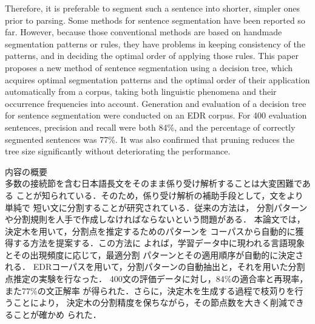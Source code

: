 Therefore, it is preferable to segment such a sentence into
 shorter, simpler ones prior to parsing.
 Some methods for sentence segmentation have been reported
 so far. However,  
because those conventional methods are based on handmade segmentation
 patterns or rules, they have problems in keeping consistency of
 the patterns, and
in deciding the optimal order of applying those rules.
This paper proposes a new method of sentence segmentation
 using a decision tree,  which acquires optimal segmentation
 patterns and the optimal order of their application
automatically from a corpus,
taking both linguistic phenomena and their occurrence
 frequencies into account. 
Generation and evaluation of a decision tree for sentence
segmentation were conducted on
an EDR corpus. For 400 evaluation sentences, precision and recall
were both 84\%, and the percentage of correctly segmented sentences
was 77\%.
It was also confirmed that pruning  reduces the
tree size significantly without deteriorating the performance.

\newpage
\noindent
内容の概要\\
多数の接続節を含む日本語長文をそのまま係り受け解析することは大変困難である
ことが知られている．そのため，係り受け解析の補助手段として，文をより単純で
短い文に分割することが研究されている．従来の方法は，
分割パターンや分割規則を人手で作成しなければならないという問題がある．
本論文では，決定木を用いて，分割点を推定するためのパターンを
コーパスから自動的に獲得する方法を提案する．この方法に
よれば，学習データ中に現われる言語現象とその出現頻度に応じて，最適分割
パターンとその適用順序が自動的に決定される．
EDRコーパスを用いて，分割パターンの自動抽出と，それを用いた分割点推定の実験を行なった．
400文の評価データに対し，84\%の適合率と再現率，また77\%の文正解率
が得られた．さらに，決定木を生成する過程で枝苅りを行うことにより，
決定木の分割精度を保ちながら，その節点数を大きく削減できることが確かめ
られた．
\newpage
